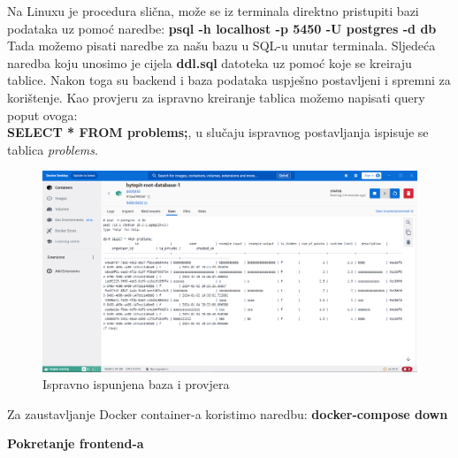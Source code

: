 				\noindent Na Linuxu je procedura slična, može se iz terminala direktno pristupiti bazi podataka uz pomoć naredbe: \textbf{psql -h localhost -p 5450 -U postgres -d db}\\
				\eject
				\noindent Tada možemo pisati naredbe za našu bazu u SQL-u unutar terminala. Sljedeća naredba koju unosimo je cijela \textbf{ddl.sql} datoteka uz pomoć koje se kreiraju tablice. Nakon toga su backend i baza podataka uspješno postavljeni i spremni za korištenje. Kao provjeru za ispravno kreiranje tablica možemo napisati query poput ovoga:\\
				\textbf{SELECT * FROM problems;}, u slučaju ispravnog postavljanja ispisuje se tablica \textit{problems}.\\
				\begin{figure}[H]
					\includegraphics[scale=0.4]{slike/postgres.PNG} 
					\centering
					\caption{Ispravno ispunjena baza i provjera}
					\label{fig:docker_desktop_postgres}
				\end{figure}
				\noindent Za zaustavljanje Docker container-a koristimo naredbu: \textbf{docker-compose down}\\
				
			\eject
			
			\noindent\textbf{Pokretanje frontend-a}\\
			
